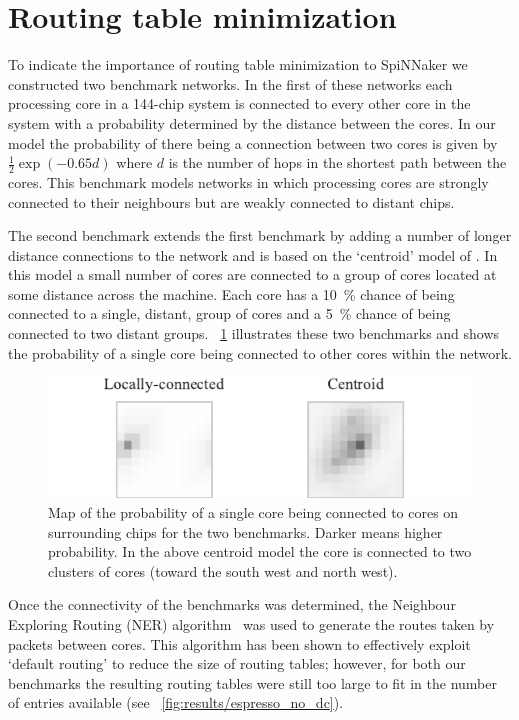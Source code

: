 \documentclass[conference]{IEEEtran}
\begin{document}
\section{Routing table minimization}

To indicate the importance of routing table minimization to SpiNNaker we constructed two benchmark networks.
In the first of these networks each processing core in a 144-chip system is connected to every other core in the system with a probability determined by the distance between the cores.
In our model the probability of there being a connection between two cores is given by $\frac{1}{2}\exp(-0.65d)$ where $d$ is the number of hops in the shortest path between the cores.
This benchmark models networks in which processing cores are strongly connected to their neighbours but are weakly connected to distant chips.

The second benchmark extends the first benchmark by adding a number of longer distance connections to the network and is based on the `centroid' model of \textcite{Navaridas2015}.
In this model a small number of cores are connected to a group of cores located at some distance across the machine.
Each core has a \SI{10}{\percent} chance of being connected to a single, distant, group of cores and a \SI{5}{\percent} chance of being connected to two distant groups.
\figurename~\ref{fig:experiment/setup} illustrates these two benchmarks and shows the probability of a single core being connected to other cores within the network.

\begin{figure}
  \centering
  \includegraphics{experiments/experiments.pdf}
  \caption{Map of the probability of a single core being connected to cores on surrounding chips for the two benchmarks. Darker means higher probability.
           In the above centroid model the core is connected to two clusters of cores (toward the south west and north west).}
  \label{fig:experiment/setup}
\end{figure}

Once the connectivity of the benchmarks was determined, the Neighbour Exploring Routing (NER) algorithm~\parencite{Navaridas2015} was used to generate the routes taken by packets between cores.
This algorithm has been shown to effectively exploit `default routing' to reduce the size of routing tables; however, for both our benchmarks the resulting routing tables were still too large to fit in the number of entries available (see \figurename~\ref{fig:results/espresso_no_dc}).
\end{document}
